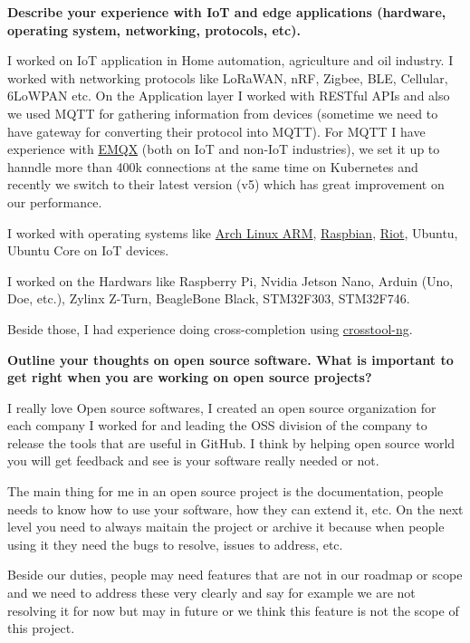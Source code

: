 \noindent
\textbf{Describe your experience with IoT and edge applications (hardware, operating system, networking, protocols, etc).}

I worked on IoT application in Home automation, agriculture and oil industry. I worked with networking protocols
like LoRaWAN, nRF, Zigbee, BLE, Cellular, 6LoWPAN etc.
On the Application layer I worked with RESTful APIs and also we used MQTT for gathering information from devices
(sometime we need to have gateway for converting their protocol into MQTT). For MQTT I have experience with
\href{https://github.com/emqx/emqx}{EMQX} (both on IoT and non-IoT industries), we set it up to hanndle more than 400k connections
at the same time on Kubernetes and recently we switch to their latest version (v5) which has great improvement on our performance.

I worked with operating systems like \href{https://archlinuxarm.org/}{Arch Linux ARM}, \href{https://www.raspbian.org/}{Raspbian},
\href{https://www.riot-os.org/}{Riot}, Ubuntu, Ubuntu Core on IoT devices.

I worked on the Hardwars like Raspberry Pi, Nvidia Jetson Nano, Arduin (Uno, Doe, etc.), Zylinx Z-Turn, BeagleBone Black,
STM32F303, STM32F746.

Beside those, I had experience doing cross-completion using \href{https://github.com/crosstool-ng/crosstool-ng}{crosstool-ng}.

\noindent
\textbf{Outline your thoughts on open source software. What is important to get right when you are working on open source projects?}

I really love Open source softwares, I created an open source organization for each company I worked for and leading
the OSS division of the company to release the tools that are useful in GitHub. I think by helping open source world
you will get feedback and see is your software really needed or not.

The main thing for me in an open source project is the documentation, people needs to know how to use your software,
how they can extend it, etc. On the next level you need to always maitain the project or archive it because
when people using it they need the bugs to resolve, issues to address, etc.

Beside our duties, people may need features that are not in our roadmap or scope and we need to address these very
clearly and say for example we are not resolving it for now but may in future or we think this feature is not the
scope of this project.

